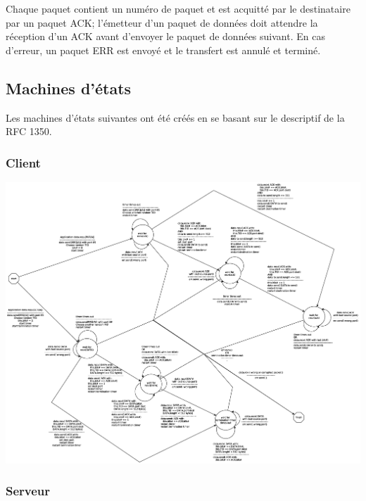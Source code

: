 \documentclass[11pt,a4paper]{article}
\begin{document}
  \par Chaque paquet contient un numéro de paquet et est acquitté par le destinataire par un paquet ACK; l'émetteur d'un paquet de données doit attendre la réception d'un ACK avant d'envoyer le paquet de données suivant.  En cas d'erreur, un paquet ERR est envoyé et le transfert est annulé et terminé. 
  
  \subsection{Machines d'états}

  \par Les machines d'états suivantes ont été créés en se basant sur le descriptif de la RFC 1350. 
  
  \subsubsection{Client}

  \begin{center}
	  \includegraphics[width=1\textwidth]{ressources/client_state-machine.eps}
  \end{center}
  
  \subsubsection{Serveur}
  
\end{document}
